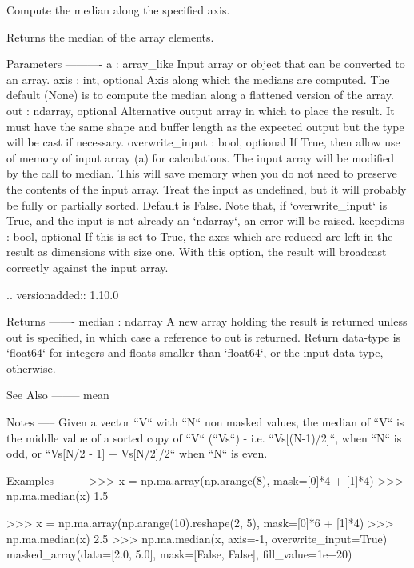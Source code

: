 \begin{DoxyVerb}Compute the median along the specified axis.

Returns the median of the array elements.

Parameters
----------
a : array_like
    Input array or object that can be converted to an array.
axis : int, optional
    Axis along which the medians are computed. The default (None) is
    to compute the median along a flattened version of the array.
out : ndarray, optional
    Alternative output array in which to place the result. It must
    have the same shape and buffer length as the expected output
    but the type will be cast if necessary.
overwrite_input : bool, optional
    If True, then allow use of memory of input array (a) for
    calculations. The input array will be modified by the call to
    median. This will save memory when you do not need to preserve
    the contents of the input array. Treat the input as undefined,
    but it will probably be fully or partially sorted. Default is
    False. Note that, if `overwrite_input` is True, and the input
    is not already an `ndarray`, an error will be raised.
keepdims : bool, optional
    If this is set to True, the axes which are reduced are left
    in the result as dimensions with size one. With this option,
    the result will broadcast correctly against the input array.

    .. versionadded:: 1.10.0

Returns
-------
median : ndarray
    A new array holding the result is returned unless out is
    specified, in which case a reference to out is returned.
    Return data-type is `float64` for integers and floats smaller than
    `float64`, or the input data-type, otherwise.

See Also
--------
mean

Notes
-----
Given a vector ``V`` with ``N`` non masked values, the median of ``V``
is the middle value of a sorted copy of ``V`` (``Vs``) - i.e.
``Vs[(N-1)/2]``, when ``N`` is odd, or ``{Vs[N/2 - 1] + Vs[N/2]}/2``
when ``N`` is even.

Examples
--------
>>> x = np.ma.array(np.arange(8), mask=[0]*4 + [1]*4)
>>> np.ma.median(x)
1.5

>>> x = np.ma.array(np.arange(10).reshape(2, 5), mask=[0]*6 + [1]*4)
>>> np.ma.median(x)
2.5
>>> np.ma.median(x, axis=-1, overwrite_input=True)
masked_array(data=[2.0, 5.0],
             mask=[False, False],
       fill_value=1e+20)\end{DoxyVerb}
 \mbox{\label{namespacenumpy_1_1ma_1_1extras_ad7bbd77e4b1dfc9e82898843eec751da}} 
